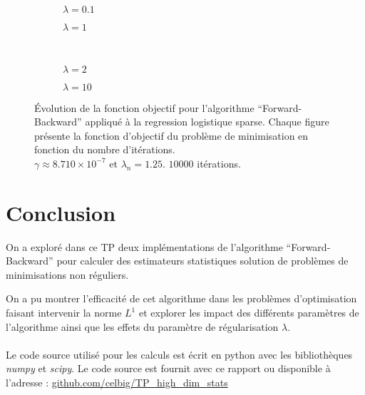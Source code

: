 \documentclass{article}
\begin{document}
\begin{figure}[h!t]
  \centering
     \begin{subfigure}[b]{0.4\textwidth}
         \centering
         \showthe\textwidth
         
         \caption{$\lambda = 0.1$}
     \end{subfigure}
     \hfill
     \begin{subfigure}[b]{0.4\textwidth}
         \centering
         
         \caption{$\lambda = 1$}
     \end{subfigure}\\
     \begin{subfigure}[b]{0.4\textwidth}
         \centering
         
         \caption{$\lambda = 2$}
         \label{fig:ex2 objectif lambda 2}
     \end{subfigure}
     \hfill
     \begin{subfigure}[b]{0.4\textwidth}
         \centering
         
         \caption{$\lambda = 10$}
     \end{subfigure}
     \caption{Évolution de la fonction objectif pour l'algorithme ``Forward-Backward'' appliqué à la regression logistique sparse. Chaque figure présente la fonction d'objectif du problème de minimisation en fonction du nombre d'itérations. \\
     $\gamma \approx 8.710\times 10^{-7}$ et $\lambda_n = 1.25$. $10000$ itérations.}
     \label{fig:ex2 objective}
\end{figure}

\section*{Conclusion}
On a exploré dans ce TP deux implémentations de l'algorithme ``Forward-Backward'' pour calculer des estimateurs statistiques solution de problèmes de minimisations non réguliers.

On a pu montrer l'efficacité de cet algorithme dans les problèmes d'optimisation faisant intervenir la norme $L^1$ et explorer les impact des différents paramètres de l'algorithme ainsi que les effets du paramètre de régularisation $\lambda$.

\paragraph{}Le code source utilisé pour les calculs est écrit en python avec les bibliothèques \textit{numpy} et \textit{scipy}. Le code source est fournit avec ce rapport ou disponible à l'adresse :  \url{github.com/celbig/TP_high_dim_stats}
\end{document}
